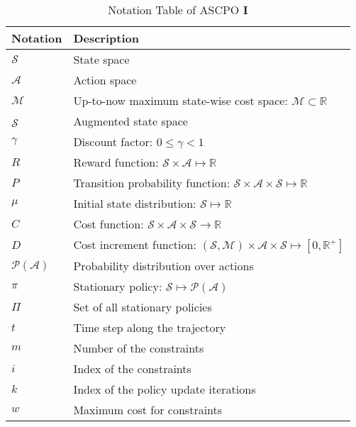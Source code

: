 

\begin{table}[H]
    \centering
    \caption{Notation Table of ASCPO \textbf{I}}
    \begin{tabular}{p{2cm} p{13cm}}
        \toprule
        \textbf{Notation} & \textbf{Description} \\
        \midrule
        $\mathcal{S}$ & State space \\
        $\mathcal{A}$ & Action space \\
        $\mathcal{M}$ & Up-to-now maximum state-wise cost space: $\mathcal{M} \subset \mathbb{R}$\\
        $\hat{\mathcal{S}}$ & Augmented state space\\
        $\gamma$ & Discount factor: $ 0 \leq \gamma < 1$ \\
        $R$ & Reward function: $\mathcal{S} \times \mathcal{A} \mapsto \mathbb{R}$ \\
        $P$ & Transition probability function: $\mathcal{S} \times \mathcal{A} \times \mathcal{S} \mapsto \mathbb{R}$ \\
        $\mu$ & Initial state distribution: $\mathcal{S} \mapsto \mathbb{R}$ \\
        $C$ & Cost function: $\mathcal{S} \times \mathcal{A} \times \mathcal{S} \rightarrow \mathbb{R}$\\
        $D$ & Cost increment function: $(\mathcal{S}, \mathcal{M}) \times \mathcal{A} \times \mathcal{S} \mapsto [0, \mathbb{R}^+]$\\
        $\mathcal{P}(\mathcal{A})$ & Probability distribution over actions \\
        $\pi$ & Stationary policy: $\mathcal{S} \mapsto \mathcal{P}(\mathcal{A})$ \\
        $\Pi$ & Set of all stationary policies \\
        $t$ & Time step along the trajectory \\
        $m$ & Number of the constraints \\
        $i$ & Index of the constraints \\
        $k$ & Index of the policy update iterations \\
        $w$ & Maximum cost for constraints \\

\end{tabular}
\end{table}
